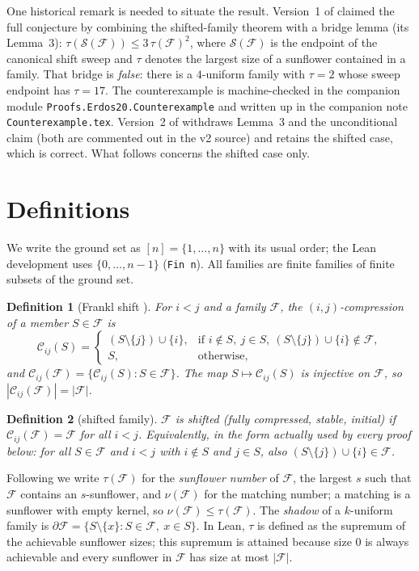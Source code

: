 \documentclass[11pt,a4paper]{article}
\newtheorem{definition}{Definition}
\theoremstyle{remark}
\newcommand{\cC}{\mathcal{C}}
\newcommand{\cF}{\mathcal{F}}
\newcommand{\cS}{\mathcal{S}}
\begin{document}
One historical remark is needed to situate the result. Version~1 of
\cite{Mi26} claimed the full conjecture by combining the shifted-family
theorem with a bridge lemma (its Lemma~3): $\tau(\cS(\cF))\le
3\,\tau(\cF)^{2}$, where $\cS(\cF)$ is the endpoint of the canonical
shift sweep and $\tau$ denotes the largest size of a sunflower
contained in a family. That bridge is \emph{false}: there is a
$4$-uniform family with $\tau=2$ whose sweep endpoint has $\tau=17$.
The counterexample is machine-checked in the companion module
\texttt{Proofs.Erdos20.Counterexample} and written up in the companion
note \texttt{Counterexample.tex}. Version~2 of \cite{Mi26} withdraws
Lemma~3 and the unconditional claim (both are commented out in the v2
source) and retains the shifted case, which is correct. What follows
concerns the shifted case only.

\section{Definitions}

We write the ground set as $[n]=\{1,\dots,n\}$ with its usual order;
the Lean development uses $\{0,\dots,n-1\}$ (\texttt{Fin n}). All
families are finite families of finite subsets of the ground set.

\begin{definition}[Frankl shift \cite{Fr87}]\label{def:shift}
For $i<j$ and a family $\cF$, the $(i,j)$-compression of a member
$S\in\cF$ is
\[
  \cC_{ij}(S)=
  \begin{cases}
    (S\setminus\{j\})\cup\{i\}, &
      \text{if } i\notin S,\ j\in S,\ (S\setminus\{j\})\cup\{i\}\notin\cF,\\
    S, & \text{otherwise,}
  \end{cases}
\]
and $\cC_{ij}(\cF)=\{\cC_{ij}(S):S\in\cF\}$. The map
$S\mapsto\cC_{ij}(S)$ is injective on $\cF$, so
$|\cC_{ij}(\cF)|=|\cF|$.
\end{definition}

\begin{definition}[shifted family]\label{def:shifted}
$\cF$ is \emph{shifted} (fully compressed, stable, initial) if
$\cC_{ij}(\cF)=\cF$ for all $i<j$. Equivalently, in the form actually
used by every proof below: for all $S\in\cF$ and $i<j$ with $i\notin S$
and $j\in S$, also $(S\setminus\{j\})\cup\{i\}\in\cF$.
\end{definition}

Following \cite{Mi26} we write $\tau(\cF)$ for the \emph{sunflower
number} of $\cF$, the largest $s$ such that $\cF$ contains an
$s$-sunflower, and $\nu(\cF)$ for the matching number; a matching is a
sunflower with empty kernel, so $\nu(\cF)\le\tau(\cF)$. The
\emph{shadow} of a $k$-uniform family is
$\partial\cF=\{S\setminus\{x\}:S\in\cF,\ x\in S\}$. In Lean, $\tau$ is
defined as the supremum of the achievable sunflower sizes; this
supremum is attained because size $0$ is always achievable and every
sunflower in $\cF$ has size at most $|\cF|$.
\end{document}
